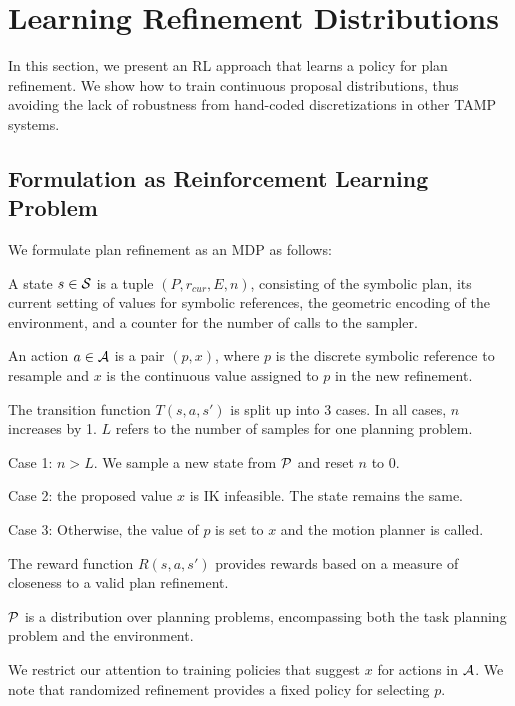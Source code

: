 \section{Learning Refinement Distributions}
In this section, we present an RL approach that learns a policy for plan refinement. We show
how to train continuous proposal distributions, thus avoiding the lack of robustness from
hand-coded discretizations in other TAMP systems.

\subsection{Formulation as Reinforcement Learning Problem}
We formulate plan refinement as an MDP as follows:
\begin{tightlist}
\item A state $s \in \mathcal{S}$ is a tuple $(P, r_{cur}, E, n)$, consisting of the
symbolic plan, its current setting of values for symbolic references,
the geometric encoding of the environment, and a counter for
the number of calls to the sampler.
\item An action $a \in \mathcal{A}$ is a pair $(p, x)$, where $p$ is the discrete symbolic
reference to resample and $x$ is the continuous value assigned to $p$ in the new refinement.
\item The transition function $T(s, a, s')$ is split up into 3 cases. In all cases, $n$ increases by 1. $L$ refers to
the number of samples for one planning problem.
  \begin{tightlist}
  \item Case 1: $n > L$. We sample a new state from $\mathcal{P}$ and reset $n$ to 0.
  \item Case 2: the proposed value $x$ is IK infeasible. The state remains the same.
  \item Case 3: Otherwise, the value of $p$ is set to $x$ and the motion planner is called.
  \end{tightlist}
\item The reward function $R(s, a, s')$ provides rewards based on a measure of closeness to a valid plan refinement.
\item $\mathcal{P}$ is a distribution over planning problems, encompassing both the task planning problem
and the environment.
\end{tightlist}

We restrict our attention to training policies that suggest $x$ for actions in $\mathcal{A}$.
We note that randomized refinement provides a fixed policy for selecting $p$.

